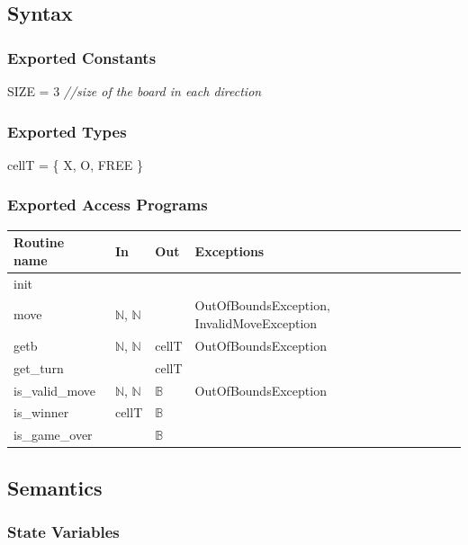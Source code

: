 \documentclass[12pt,fleqn]{examtst}
\begin{document}
\subsection* {Syntax}

\subsubsection* {Exported Constants}

SIZE = 3 {\it //size of the board in each direction}\\

\subsubsection* {Exported Types}

cellT = \{ X, O, FREE \} \\

\subsubsection* {Exported Access Programs}

\begin{tabular}{| l | l | l | p{7cm} |}
\hline
\textbf{Routine name} & \textbf{In} & \textbf{Out} & \textbf{Exceptions}\\
\hline
init & ~ & ~ & ~\\
\hline
move & $\mathbb{N}$, $\mathbb{N}$ & ~ & OutOfBoundsException, InvalidMoveException\\
\hline
getb & $\mathbb{N}$, $\mathbb{N}$ & cellT & OutOfBoundsException\\
\hline
get\_turn & ~ & cellT & ~\\
\hline
is\_valid\_move & $\mathbb{N}$, $\mathbb{N}$ & $\mathbb{B}$ & OutOfBoundsException\\
\hline
is\_winner & cellT & $\mathbb{B}$ & ~\\
\hline
is\_game\_over & ~ & $\mathbb{B}$ & ~\\
\hline

\end{tabular}

\subsection* {Semantics}

\subsubsection* {State Variables}
\end{document}
